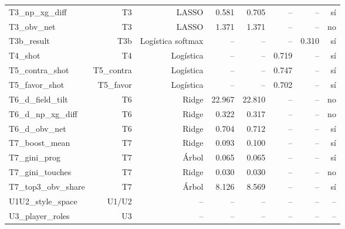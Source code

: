 {\begin{longtable}{lrrrrrrr}
T3\_np\_xg\_diff & T3 & LASSO & 0.581 & 0.705 & -- & -- & sí \\
T3\_obv\_net & T3 & LASSO & 1.371 & 1.371 & -- & -- & no \\
T3b\_result & T3b & Logística softmax & -- & -- & -- & 0.310 & sí \\
T4\_shot & T4 & Logística & -- & -- & 0.719 & -- & sí \\
T5\_contra\_shot & T5\_contra & Logística & -- & -- & 0.747 & -- & sí \\
T5\_favor\_shot & T5\_favor & Logística & -- & -- & 0.702 & -- & sí \\
T6\_d\_field\_tilt & T6 & Ridge & 22.967 & 22.810 & -- & -- & no \\
T6\_d\_np\_xg\_diff & T6 & Ridge & 0.322 & 0.317 & -- & -- & no \\
T6\_d\_obv\_net & T6 & Ridge & 0.704 & 0.712 & -- & -- & sí \\
T7\_boost\_mean & T7 & Ridge & 0.093 & 0.100 & -- & -- & sí \\
T7\_gini\_prog & T7 & Árbol & 0.065 & 0.065 & -- & -- & sí \\
T7\_gini\_touches & T7 & Ridge & 0.030 & 0.030 & -- & -- & no \\
T7\_top3\_obv\_share & T7 & Árbol & 8.126 & 8.569 & -- & -- & sí \\
U1U2\_style\_space & U1/U2 & -- & -- & -- & -- & -- & -- \\
U3\_player\_roles & U3 & -- & -- & -- & -- & -- & -- \\
\end{longtable}
}